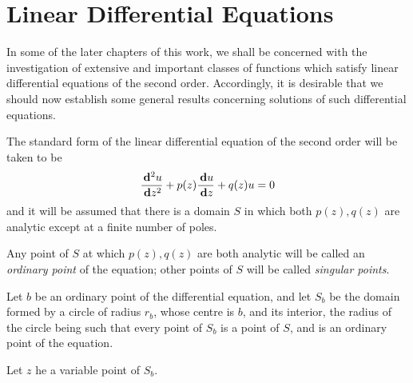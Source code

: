 %
%
\chapter{Linear Differential Equations}


In some of the later chapters of this work, we shall be concerned with
the investigation of extensive and important classes of functions
which satisfy linear differential equations of the second order.
Accordingly, it is desirable that we should now establish some general
results concerning solutions of such differential equations.

The standard form of the linear differential equation of the second
order will be taken to be
\begin{equation}
  \frac{\, \mathbf{d}^{2} u}{\, \mathbf{d} z^{2}}
  + p(z) \frac{\, \mathbf{d} u}{\, \mathbf{d} z}
  + q(z) u
  = 0
\end{equation}
and it will be assumed that there is a domain $S$ in which both
$p(z), q(z)$ are analytic except at a finite number of poles.

Any point of $S$ at which $p(z), q(z)$ are both analytic will be called
an \emph{ordinary point} of the equation; other points of $S$ will be called
\emph{singular points}.


Let $b$ be an ordinary point of the differential equation, and let $S_{b}$ be
the domain formed by a circle of radius $r_{b}$, whose centre is $b$, and its
interior, the radius of the circle being such that every point of $S_{b}$ is
a point of $S$, and is an ordinary point of the equation.

Let $z$ he a variable point of $S_{b}$.

